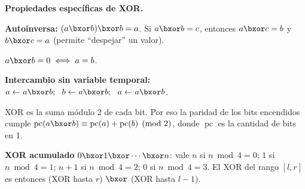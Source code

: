 \textbf{Propiedades específicas de XOR.}
\begin{props}
  \item \textbf{Autoinversa:} \((a \bxor b) \bxor b = a\). Si \(a \bxor b = c\), entonces \(a \bxor c = b\) y \(b \bxor c = a\) (permite ``despejar'' un valor).
  \item \(a \bxor b = 0 \iff a = b\).
  \item \textbf{Intercambio sin variable temporal:} \(a \gets a \bxor b;\ \ b \gets a \bxor b;\ \ a \gets a \bxor b\).
  \item XOR es la suma módulo 2 de cada bit. Por eso la paridad de los bits encendidos cumple \(\operatorname{pc}(a \bxor b) \equiv \operatorname{pc}(a) + \operatorname{pc}(b) \pmod 2\), donde \(\operatorname{pc}\) es la cantidad de bits en 1.
  \item \textbf{XOR acumulado} \(0 \bxor 1 \bxor \cdots \bxor n\): vale \(n\) si \(n \bmod 4 = 0\); \(1\) si \(n \bmod 4 = 1\); \(n+1\) si \(n \bmod 4 = 2\); \(0\) si \(n \bmod 4 = 3\). El XOR del rango \([l, r]\) es entonces (XOR hasta \(r\)) \(\bxor\) (XOR hasta \(l-1\)).
\end{props}

